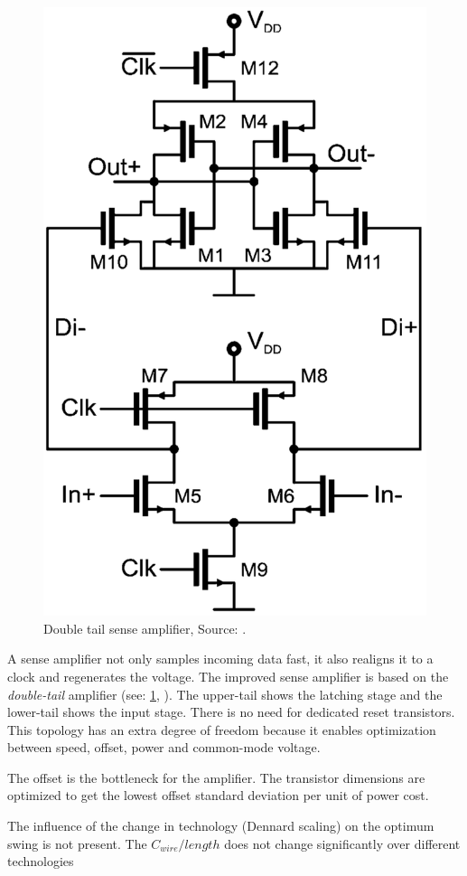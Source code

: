 \begin{figure}
    \centering
	\includegraphics[width=0.6\linewidth]{Figures/Rep2DoubleTail.png}
	\caption{Double tail sense amplifier, Source: \cite{schinkel2009low}.} 
    \label{fig:rep2:doubletail}
\end{figure}

A sense amplifier not only samples incoming data fast, it also realigns it to a clock and regenerates the voltage.
The improved sense amplifier is based on the \textit{double-tail} amplifier (see: \cref{fig:rep2:doubletail}, \cite{schinkel2007double}).
The upper-tail shows the latching stage and the lower-tail shows the input stage.
There is no need for dedicated reset transistors.
This topology has an extra degree of freedom because it enables optimization between speed, offset, power and common-mode voltage.

The offset is the bottleneck for the amplifier.
The transistor dimensions are optimized to get the lowest offset standard deviation per unit of power cost.

The influence of the change in technology (Dennard scaling) on the optimum swing is not present.
The $C_{wire}/length$ does not change significantly over different technologies



